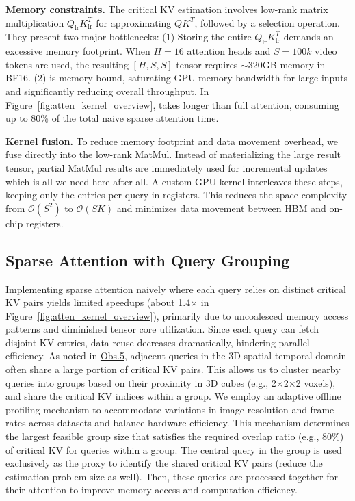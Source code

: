 \noindent\textbf{Memory constraints.} 
The critical KV estimation involves low-rank matrix multiplication $Q_{\text{lr}}K_{\text{lr}}^T$ for approximating $QK^T$, followed by a \topk selection operation. 
They present two major bottlenecks: (1) Storing the entire $Q_{\text{lr}}K_{\text{lr}}^T$ demands an excessive memory footprint.
When \(H=16\) attention heads and \(S=100k\) video tokens are used, the resulting \([H, S, S]\) tensor requires $\sim$320GB memory in BF16.
(2) \topk is memory-bound, saturating GPU memory bandwidth for large inputs and significantly reducing overall throughput.
In Figure~\ref{fig:atten_kernel_overview}, \topk takes longer than full attention, consuming up to 80\% of the total naive sparse attention time. 

\noindent\textbf{Kernel fusion.} 
To reduce memory footprint and data movement overhead, we fuse \topk directly into the low-rank MatMul. Instead of materializing the large result tensor, partial MatMul results are immediately used for incremental \topk updates which is all we need here after all.
A custom GPU kernel interleaves these steps, keeping only the \topk entries per query in registers. This reduces the space complexity from \(\mathcal{O}(S^2)\) to \(\mathcal{O}(S K)\) and minimizes data movement between HBM and on-chip registers.

\subsection{Sparse Attention with Query Grouping}
\label{sec:sparse_kernel}
Implementing sparse attention naively where each query relies on distinct critical KV pairs yields limited speedups (about 1.4$\times$ in Figure~\ref{fig:atten_kernel_overview}), primarily due to uncoalesced memory access patterns and diminished tensor core utilization. Since each query can fetch disjoint KV entries, data reuse decreases dramatically, hindering parallel efficiency.
As noted in \hyperlink{obs5}{Obs.5}, adjacent queries in the 3D spatial-temporal domain often share a large portion of critical KV pairs. 
This allows us to cluster nearby queries into groups based on their proximity in 3D cubes (e.g., 2$\times$2$\times$2 voxels), and share the critical KV indices within a group. 
We employ an adaptive offline profiling mechanism to accommodate variations in image resolution and frame rates across datasets and balance hardware efficiency. This mechanism determines the largest feasible group size that satisfies the required overlap ratio (e.g., 80\%) of critical KV for queries within a group. The central query in the group is used exclusively as the proxy to identify the shared critical KV pairs (reduce the estimation problem size as well). Then, these queries are processed together for their attention to improve memory access and computation efficiency.




